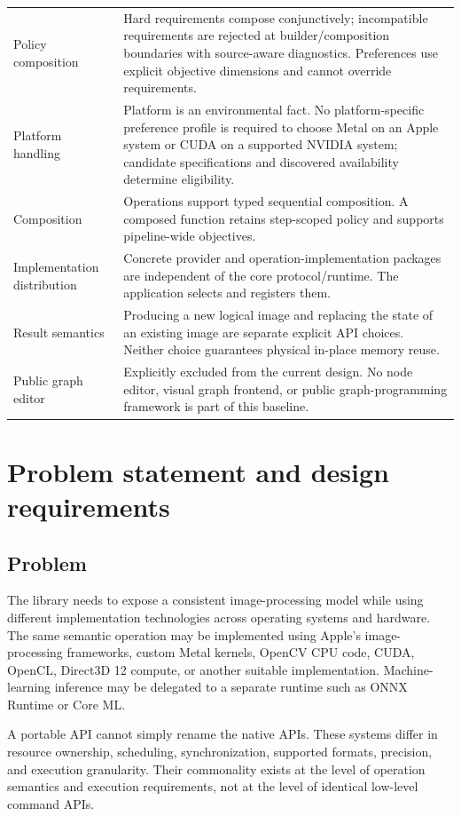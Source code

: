 \documentclass[11pt,a4paper,oneside]{article}
\begin{document}
\begin{longtable}{@{}L{0.27\textwidth}Z{0.67\textwidth}@{}}
Policy composition & Hard requirements compose conjunctively; incompatible requirements are rejected at builder/composition boundaries with source-aware diagnostics. Preferences use explicit objective dimensions and cannot override requirements. \\
Platform handling & Platform is an environmental fact. No platform-specific preference profile is required to choose Metal on an Apple system or CUDA on a supported NVIDIA system; candidate specifications and discovered availability determine eligibility. \\
Composition & Operations support typed sequential composition. A composed function retains step-scoped policy and supports pipeline-wide objectives. \\
Implementation distribution & Concrete provider and operation-implementation packages are independent of the core protocol/runtime. The application selects and registers them. \\
Result semantics & Producing a new logical image and replacing the state of an existing image are separate explicit API choices. Neither choice guarantees physical in-place memory reuse. \\
Public graph editor & Explicitly excluded from the current design. No node editor, visual graph frontend, or public graph-programming framework is part of this baseline. \\
\bottomrule
\end{longtable}

\section{Problem statement and design requirements}

\subsection{Problem}

The library needs to expose a consistent image-processing model while using different implementation technologies across operating systems and hardware. The same semantic operation may be implemented using Apple's image-processing frameworks, custom Metal kernels, OpenCV CPU code, CUDA, OpenCL, Direct3D 12 compute, or another suitable implementation. Machine-learning inference may be delegated to a separate runtime such as ONNX Runtime or Core ML.

A portable API cannot simply rename the native APIs. These systems differ in resource ownership, scheduling, synchronization, supported formats, precision, and execution granularity. Their commonality exists at the level of operation semantics and execution requirements, not at the level of identical low-level command APIs.
\end{document}
